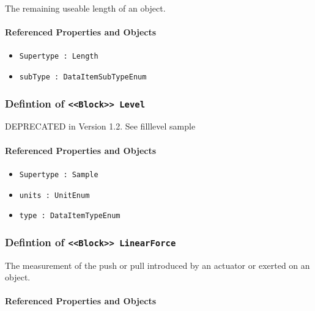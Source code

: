 \FloatBarrier

The remaining useable length of an object.

\FloatBarrier
\paragraph{Referenced Properties and Objects}

\begin{itemize}
\item \texttt{Supertype : Length}

\item \texttt{subType : DataItemSubTypeEnum}

\end{itemize}
\FloatBarrier
\subsubsection{Defintion of \texttt{<<Block>> Level}}
  \label{type:Level}

\FloatBarrier

DEPRECATED in Version 1.2.  See filllevel sample

\FloatBarrier
\paragraph{Referenced Properties and Objects}

\begin{itemize}
\item \texttt{Supertype : Sample}

\item \texttt{units : UnitEnum}

\item \texttt{type : DataItemTypeEnum}

\end{itemize}
\FloatBarrier
\subsubsection{Defintion of \texttt{<<Block>> LinearForce}}
  \label{type:LinearForce}

\FloatBarrier

The measurement of the push or pull introduced by an actuator or exerted on an object.

\FloatBarrier
\paragraph{Referenced Properties and Objects}


